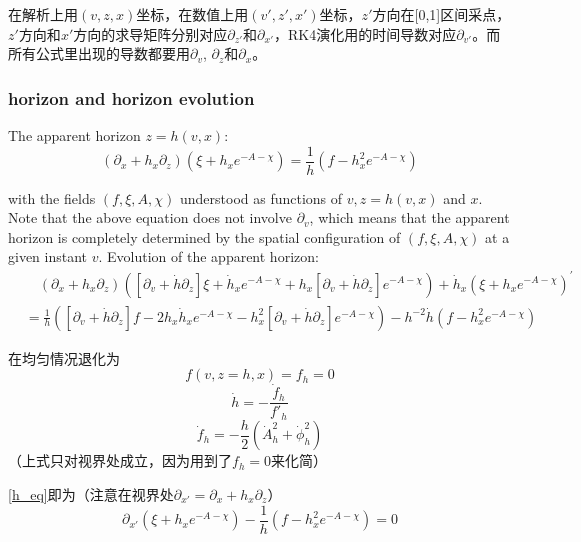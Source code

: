 \documentclass[12pt,a4paper]{ctexart}
\numberwithin{equation}{section}
\begin{document}
在解析上用$(v,z,x)$坐标，在数值上用$(v',z',x')$坐标，$z'$方向在[0,1]区间采点，$z'$方向和$x'$方向的求导矩阵分别对应$\partial_{z'}$和$\partial_{x'}$，RK4演化用的时间导数对应$\partial_{v'}$。而所有公式里出现的导数都要用$\partial_v$, $\partial_z$和$\partial_x$。

\subsubsection{horizon and horizon evolution}

The apparent horizon $z=h(v,x)$:
\begin{equation}\label{h_eq}
    (\partial_{x}+h_{x}\partial_{z})(\xi+h_{x}e^{-A-\chi})=\frac{1}{h}(f-h_{x}^{2}e^{-A-\chi})
\end{equation}

with the fields $(f,\xi,A,\chi)$ understood as functions of $v, z=h(v,x)$ and $x$. Note that the above equation does not involve $\partial_{v}$, which means that the apparent horizon is completely determined by the spatial configuration of $(f,\xi,A,\chi)$ at a given instant $v$. Evolution of the apparent horizon:
\begin{equation}\label{pv_h_eq}
    \begin{aligned}
        &\quad(\partial_{x}+h_{x}\partial_{z})([\partial_{v}+\dot{h}\partial_{z}]\xi+\dot{h}_{x}e^{-A-\chi}+h_{x}[\partial_{v}+\dot{h}\partial_{z}]e^{-A-\chi})+\dot{h}_{x}(\xi+h_{x}e^{-A-\chi})^{\prime}\\
        &=\frac{1}{h}([\partial_{v}+\dot{h}\partial_{z}]f-2h_{x}\dot{h}_{x}e^{-A-\chi}-h_{x}^{2}[\partial_{v}+\dot{h}\partial_{z}]e^{-A-\chi})-h^{-2}\dot{h}(f-h_{x}^{2}e^{-A-\chi})
    \end{aligned}
\end{equation}

在均匀情况退化为
\begin{equation}
    f(v,z=h,x)=f_h=0
\end{equation}
\begin{equation}
    \dot{h}=-\frac{\dot{f}_h}{f'_h}
\end{equation}
\begin{equation}
    \dot{f}_h=-\frac{h}{2}(\dot{A}_h^2+\dot{\phi}_h^2)
\end{equation}
（上式只对视界处成立，因为用到了$f_h=0$来化简）

\eqref{h_eq}即为（注意在视界处$\partial_{x'}=\partial_x+h_x\partial_z$）
\begin{equation}
    \partial_{x'}(\xi+h_{x}e^{-A-\chi})-\frac{1}{h}(f-h_{x}^{2}e^{-A-\chi})=0
\end{equation}
\end{document}
